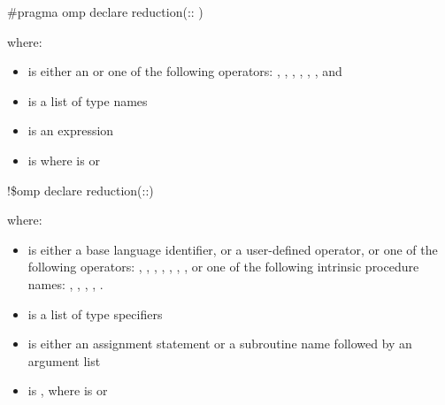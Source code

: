 \cppspecificstart
\begin{boxedcode}
\#pragma omp declare reduction(:: 
)
\end{boxedcode}

where:

\begin{itemize}
\item {} is either an  or one of the following 
operators: 
\code{+}, 
\code{-}, 
\code{*}, 
\code{\&}, 
\code{|}, 
\code{\^}, 
\code{\&\&} and 
\code{||} 

\item {} is a list of type names 

\item {} is an expression 

\item {} is \code{)} 
where  is\linebreak
{} or \code{(}\code{)} 
\end{itemize}
\cppspecificend


\fortranspecificstart
\begin{boxedcode}
!\$omp declare reduction(::) 
\end{boxedcode}

where:

\begin{itemize}
\item {} is either a base language identifier, or a user-defined operator, or 
one of the following operators: 
\code{+}, 
\code{-}, 
\code{*}, 
, 
, 
, 
, or one of the following intrinsic procedure names: 
, 
, 
, 
, 
. 

\item {} is a list of type specifiers 

\item {} is either an assignment statement or a subroutine name followed by an 
argument list 

\item {} is \code{)}, 
where  is\linebreak
{} or \code{(}\code{)}
\end{itemize}
\fortranspecificend

